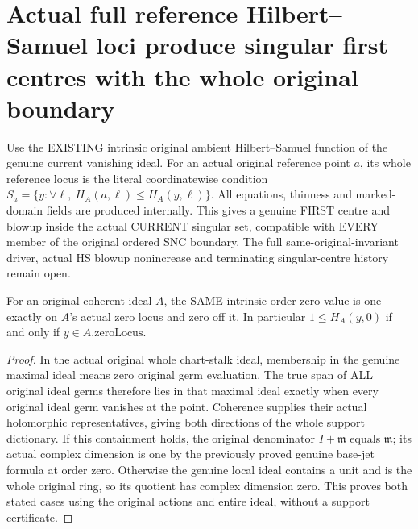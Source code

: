 \section{Actual full reference Hilbert--Samuel loci produce singular first centres with the whole original boundary}

Use the EXISTING intrinsic original ambient Hilbert--Samuel function of
the genuine current vanishing ideal. For an actual original reference
point $a$, its whole reference locus is the literal coordinatewise condition
$S_a=\{y:\forall\ell,\ H_A(a,\ell)\leq H_A(y,\ell)\}$.
All equations, thinness and marked-domain fields are produced internally.
This gives a genuine FIRST centre and blowup inside the actual CURRENT
singular set, compatible with EVERY member of the original ordered SNC
boundary. The full same-original-invariant driver, actual HS blowup
nonincrease and terminating singular-centre history remain open.

\begin{lemma}
\label{hir:actual-order-zero-hs-whole-support-dictionary}
\leanok
For an original coherent ideal $A$, the SAME intrinsic order-zero value
is one exactly on $A$'s actual zero locus and zero off it. In particular
$1\leq H_A(y,0)$ if and only if $y\in A.\mathrm{zeroLocus}$.
\end{lemma}
\begin{proof}
In the actual original whole chart-stalk ideal, membership in the genuine
maximal ideal means zero original germ evaluation. The true span of ALL
original ideal germs therefore lies in that maximal ideal exactly when
every original ideal germ vanishes at the point. Coherence supplies their
actual holomorphic representatives, giving both directions of the whole
support dictionary. If this containment holds, the original denominator
$I+\mathfrak m$ equals $\mathfrak m$; its actual complex dimension is one
by the previously proved genuine base-jet formula at order zero. Otherwise
the genuine local ideal contains a unit and is the whole original ring,
so its quotient has complex dimension zero. This proves both stated cases
using the original actions and entire ideal, without a support certificate.
\end{proof}

